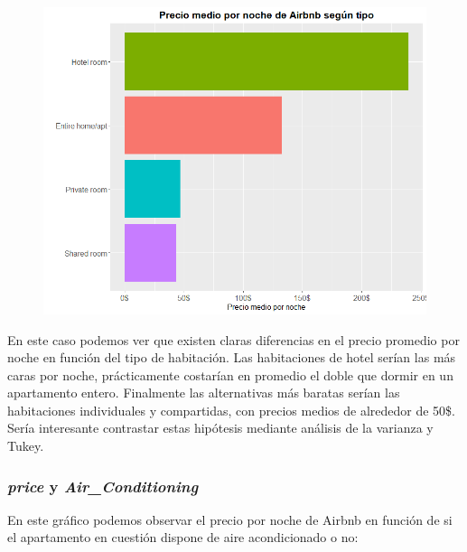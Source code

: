 \documentclass{article}
\begin{document}
\vspace{0.35cm}
\begin{figure}[h]
\hspace*{-0.15cm}
\centering
\includegraphics[scale = 0.6]{price_room_type}
\end{figure}
\vspace{0.15cm}

En este caso podemos ver que existen claras diferencias en el precio promedio por noche en función del tipo de habitación. Las habitaciones de hotel serían las más caras por noche, prácticamente costarían en promedio el doble que dormir en un apartamento entero. Finalmente las alternativas más baratas serían las habitaciones individuales y compartidas, con precios medios de alrededor de 50\$. Sería interesante contrastar estas hipótesis mediante análisis de la varianza y Tukey. 

\clearpage
\subsubsection{\emph{price} y \emph{Air\_Conditioning}}

En este gráfico podemos observar el precio por noche de Airbnb en función de si el apartamento en cuestión dispone de aire acondicionado o no:
\end{document}
